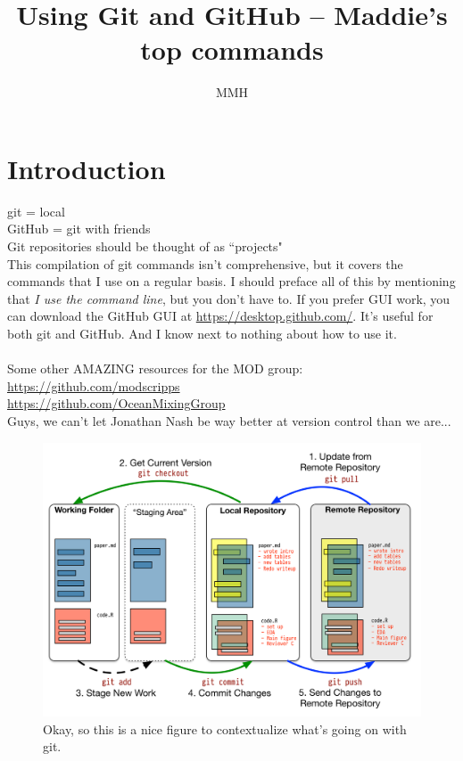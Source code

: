 \documentclass[12pt]{article}
\title{Using Git and GitHub -- Maddie's top commands}
\author{MMH}
\begin{document}
\maketitle
  
\section*{Introduction}

git = local\\
GitHub = git with friends\\
Git repositories should be thought of as ``projects"\\

This compilation of git commands isn't comprehensive, but it covers the commands that I use on a regular basis. I should preface all of this by mentioning that {\it I use the command line}, but you don't have to. If you prefer GUI work, you can download the GitHub GUI at \href{url}{https://desktop.github.com/}. It's useful for both git and GitHub. And I know next to nothing about how to use it.\\ \\

Some other AMAZING resources for the MOD group:\\
\href{url}{https://github.com/modscripps} \\ 
\href{url}{https://github.com/OceanMixingGroup}\\
Guys, we can't let Jonathan Nash be way better at version control than we are...

\begin{figure}[hbt]
	\includegraphics[width=\textwidth]{git-basic.png}
	\caption{Okay, so this is a nice figure to contextualize what's going on with git.}
\end{figure}
\end{document}
